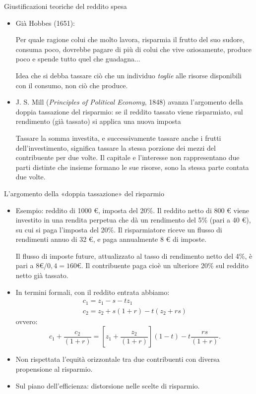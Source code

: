 \documentclass[11pt]{beamer}
\newcommand\€{\,\text{€}}
\begin{document}
\begin{frame}{Giustificazioni teoriche del reddito spesa}
\begin{itemize}
\item Già Hobbes (1651):
\begin{quoting}\small
   Per quale ragione colui che molto lavora, risparmia il frutto del suo 
   sudore, consuma poco, dovrebbe pagare di più di colui che vive
   oziosamente, produce poco e spende tutto quel che guadagna...
\end{quoting}
Idea che si debba tassare ciò che un individuo \emph{toglie} alle risorse
disponibili con il consumo, non ciò che produce.
\item J. S. Mill (\emph{Principles of Political Economy}, 1848) avanza l'argomento
della \alert{doppia tassazione del risparmio}: se il reddito tassato viene
risparmiato, sul rendimento (già tassato) si applica una nuova imposta
\begin{quoting}\small
Tassare la somma investita, e successivamente tassare anche i frutti dell'investimento, significa tassare la stessa porzione dei mezzi del contribuente per due volte. Il capitale e l'interesse non rappresentano due parti distinte che insieme formano le sue risorse, sono la stessa parte contata due volte.
\end{quoting}
\end{itemize}
\end{frame}


\begin{frame}{L'argomento della «doppia tassazione» del risparmio}
\begin{itemize}
\item Esempio: reddito di 1000 €, imposta del 20\%. Il reddito netto di 800 € viene
investito in una rendita perpetua che dà un rendimento del 5\% (pari a 40 €),
su cui si paga l'imposta del 20\%.  Il risparmiatore riceve un flusso di
rendimenti annuo di 32 €, e paga annualmente 8 € di imposte.

Il flusso di imposte future, attualizzato al tasso di rendimento netto del
4\%, è pari a $8€/0,4=160 €$. Il contribuente paga cioè un ulteriore 20\% sul reddito
netto già tassato.

\item In termini formali, con il reddito entrata abbiamo:  
\begin{gather*}
  c_1=z_1-s-tz_1\\
  c_2=z_2+s(1+r) -t(z_2 +rs)
\end{gather*}
ovvero:
\begin{equation*}
c_1+\frac{c_2}{(1+r)}=
\left[z_1+\frac{z_2}{(1+r)}\right](1-t)-t\frac{rs}{(1+r)}.
\end{equation*}
\item Non rispettata l'equità orizzontale tra due contribuenti con diversa
propensione al risparmio.
\item Sul piano dell'efficienza: distorsione nelle scelte di risparmio.
\end{itemize}
\end{frame}
\end{document}

